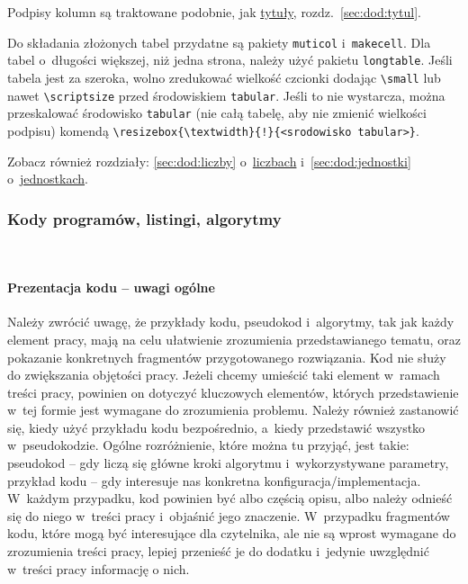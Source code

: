 Podpisy kolumn są traktowane podobnie, jak \hyperref[sec:dod:tytul]{tytuły}, rozdz.~\ref{sec:dod:tytul}.

Do składania złożonych tabel przydatne są pakiety {\tt muticol} i~{\tt makecell}. Dla tabel o~długości większej, niż jedna strona, należy użyć pakietu {\tt longtable}. Jeśli tabela jest za szeroka, wolno zredukować wielkość czcionki dodając \verb+\small+ lub nawet \verb+\scriptsize+ przed środowiskiem {\tt tabular}. Jeśli to nie wystarcza, można przeskalować środowisko {\tt tabular} (nie całą tabelę, aby nie zmienić wielkości podpisu) komendą \verb+\resizebox{\textwidth}{!}{<srodowisko tabular>}+. 

Zobacz również rozdziały: \ref{sec:dod:liczby} o~\hyperref[sec:dod:liczby]{liczbach} i~\ref{sec:dod:jednostki} o~\hyperref[sec:dod:jednostki]{jednostkach}.


\subsubsection{Kody programów, listingi, algorytmy}\mbox{}\\[-2.55\baselineskip]
\label{sec:dod:listing}\vspace{-1ex} %


\paragraph{Prezentacja kodu -- uwagi ogólne}
\label{sec:dod:listing-uwagi-ogolne}
Należy zwrócić uwagę, że przykłady kodu, pseudokod i~algorytmy, tak jak każdy element pracy, mają na celu ułatwienie zrozumienia przedstawianego tematu, oraz pokazanie konkretnych fragmentów przygotowanego rozwiązania. Kod nie służy do zwiększania objętości pracy. Jeżeli chcemy umieścić taki element w~ramach treści pracy, powinien on dotyczyć kluczowych elementów, których przedstawienie w~tej formie jest wymagane do zrozumienia problemu. Należy również zastanowić się, kiedy użyć przykładu kodu bezpośrednio, a~kiedy przedstawić wszystko w~pseudokodzie. Ogólne rozróżnienie, które można tu przyjąć, jest takie: pseudokod -- gdy liczą się główne kroki algorytmu i~wykorzystywane parametry, przykład kodu -- gdy interesuje nas konkretna konfiguracja/implementacja. W~każdym przypadku, kod powinien być albo częścią opisu, albo należy odnieść się do niego w~treści pracy i~objaśnić jego znaczenie. W~przypadku fragmentów kodu, które mogą być interesujące dla czytelnika, ale nie są wprost wymagane do zrozumienia treści pracy, lepiej przenieść je do dodatku i~jedynie uwzględnić w~treści pracy informację o nich.



